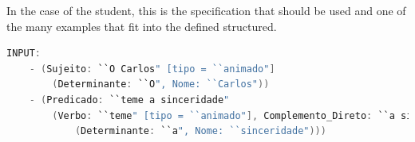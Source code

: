 
In the case of the student, this is the specification that should be used and one of the many examples that fit into the defined structured.

\begin{center}
\begin{minipage}{13cm}
\begin{lstlisting}[language=java, basicstyle=\tiny, label={lst:meta_input}, caption=Example of the students parsing]
INPUT:
    - (Sujeito: ``O Carlos" [tipo = ``animado"]
        (Determinante: ``O", Nome: ``Carlos"))
    - (Predicado: ``teme a sinceridade" 
        (Verbo: ``teme" [tipo = ``animado"], Complemento_Direto: ``a sinceridade" 
            (Determinante: ``a", Nome: ``sinceridade")))
\end{lstlisting}
\end{minipage}
\end{center}


